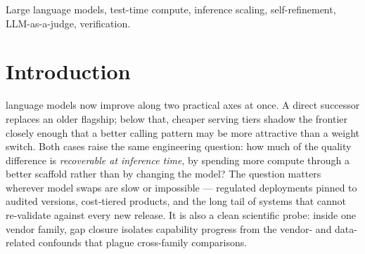 \documentclass[journal]{IEEEtran}
\newcommand{\method}{RAAR}
\begin{document}
\begin{abstract}
0.274 absolute on 11 matched primary tasks but closes only 0.304 of its
Fable gap (95\% CI $[-0.111, 0.639]$). At Sonnet tier, Self-Refine is numerically the
strongest loop arm, and on the matched 11-task primary set the loop family
lifts Sonnet base from 0.730 to 0.820--0.901 (the upper value is
Self-Refine on the same 11-task denominator; its scored-available 12-task
macro is 0.873) with no measurable separation among loop variants.
A direct-answer Sonnet control
falls to 0.478, consistent with deliberation being load-bearing. Across
the two studies, the practical reading is bounded but useful: one tier down
plus \method{} can narrow the gap toward \emph{unscaffolded} frontier output
(Fable single-pass) on a filtered verification-shaped subset --- we did not complete
an equal-scaffolding (Fable+\method{}) frontier control --- whereas
open-ended coherence tasks and two-tier drops do not recover.
\end{abstract}

\begin{IEEEkeywords}
Large language models, test-time compute, inference scaling, self-refinement,
LLM-as-a-judge, verification.
\end{IEEEkeywords}

\section{Introduction}
 language models now improve along two practical
axes at once. A direct successor replaces an older flagship; below that,
cheaper serving tiers shadow the frontier closely enough that a better
calling pattern may be more attractive than a weight switch. Both cases
raise the same engineering question: how much of the quality difference is
\emph{recoverable at inference time}, by spending more compute through a
better scaffold rather than by changing the model? The question matters
wherever model swaps are slow or impossible --- regulated deployments pinned
to audited versions, cost-tiered products, and the long tail of systems
that cannot re-validate against every new release. It is also a clean
scientific probe: inside one vendor family, gap closure isolates capability
progress from the vendor- and data-related confounds that plague cross-family
comparisons.
\end{document}
